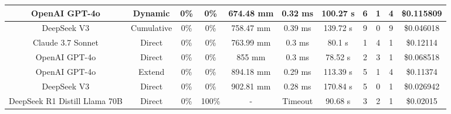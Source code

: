 \begin{landscape}
\begin{table}[H]
\begin{center}
\begin{tabular}{|c|c|c|c|c|c|c|c|c|c|c|}
    OpenAI GPT-4o & Dynamic & 0\% & 0\% & 674.48 mm & 0.32 ms & 100.27 s & 6 & 1 & 4 & \$0.115809 \\
    \hline
    DeepSeek V3 & Cumulative & 0\% & 0\% & 758.47 mm & 0.39 ms & 139.72 s & 9 & 0 & 9 & \$0.046018 \\
    \hline
    Claude 3.7 Sonnet & Direct & 0\% & 0\% & 763.99 mm & 0.3 ms & 80.1 s & 1 & 4 & 1 & \$0.12114 \\
    \hline
    OpenAI GPT-4o & Direct & 0\% & 0\% & 855 mm & 0.3 ms & 78.52 s & 2 & 3 & 1 & \$0.068518 \\
    \hline
    OpenAI GPT-4o & Extend & 0\% & 0\% & 894.18 mm & 0.29 ms & 113.39 s & 5 & 1 & 4 & \$0.11374 \\
    \hline
    DeepSeek V3 & Direct & 0\% & 0\% & 902.81 mm & 0.28 ms & 170.84 s & 5 & 0 & 1 & \$0.026942 \\
    \hline
    DeepSeek R1 Distill Llama 70B & Direct & 0\% & 100\% & - & Timeout & 90.68 s & 3 & 2 & 1 & \$0.02015 \\
    \hline
\end{tabular}
\label{Results-Position-1-3}
\end{center}
\end{table}


\end{landscape}
